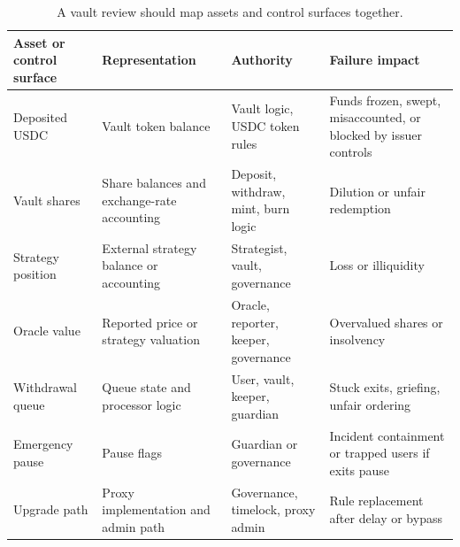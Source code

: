 \begin{table}[htbp]
\centering
\small
\renewcommand{\arraystretch}{1.18}
\begin{tabularx}{\textwidth}{@{}>{\RaggedRight\arraybackslash}p{}>{\RaggedRight\arraybackslash}p{}>{\RaggedRight\arraybackslash}p{}X@{}}
\toprule
Asset or control surface & Representation & Authority & Failure impact \\
\midrule
Deposited USDC & Vault token balance & Vault logic, USDC token rules & Funds frozen, swept, misaccounted, or blocked by issuer controls \\
Vault shares & Share balances and exchange-rate accounting & Deposit, withdraw, mint, burn logic & Dilution or unfair redemption \\
Strategy position & External strategy balance or accounting & Strategist, vault, governance & Loss or illiquidity \\
Oracle value & Reported price or strategy valuation & Oracle, reporter, keeper, governance & Overvalued shares or insolvency \\
Withdrawal queue & Queue state and processor logic & User, vault, keeper, guardian & Stuck exits, griefing, unfair ordering \\
Emergency pause & Pause flags & Guardian or governance & Incident containment or trapped users if exits pause \\
Upgrade path & Proxy implementation and admin path & Governance, timelock, proxy admin & Rule replacement after delay or bypass \\
\bottomrule
\end{tabularx}
\caption{A vault review should map assets and control surfaces together.}
\end{table}


